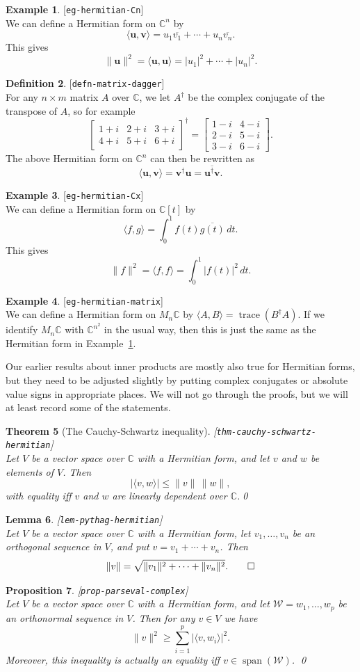 \documentclass{amsart}
\newcommand{\lbl}[1]{\label{#1}\textup{[\texttt{#1}]}\ \\}
\newcommand{\lbl}{\label}
\newcommand{\C}         {{\mathbb{C}}}
\newcommand{\trc}       {\operatorname{trace}}
\newcommand{\spn}       {\operatorname{span}}
\newcommand{\bsm}       {\left[\begin{smallmatrix}}
\newcommand{\esm}       {\end{smallmatrix}\right]}
\newcommand{\tm}        {\times}
\newcommand{\ip}[1]     {\langle #1\rangle}
\newcommand{\ov}[1]     {\overline{#1}}
\newcommand{\vu}        {\mathbf{u}}
\newcommand{\vv}        {\mathbf{v}}
\newcommand{\CW}        {{\mathcal{W}}}
\renewcommand{\:}       {\colon}
\newtheorem{theorem}{Theorem}[section]
\newtheorem{lemma}[theorem]{Lemma}
\newtheorem{proposition}[theorem]{Proposition}
\theoremstyle{definition}
\newtheorem{definition}[theorem]{Definition}
\newtheorem{example}[theorem]{Example}
\begin{document}
\begin{example}\lbl{eg-hermitian-Cn}
 We can define a Hermitian form on $\C^n$ by 
 \[ \ip{\vu,\vv} = u_1\ov{v_1} + \dotsb + u_n\ov{v_n}. \]
 This gives 
 \[ \|\vu\|^2 = \ip{\vu,\vu} = |u_1|^2 + \dotsb + |u_n|^2. \]
\end{example}
\begin{definition}\lbl{defn-matrix-dagger}
 For any $n\tm m$ matrix $A$ over $\C$, we let $A^\dag$ be
 the complex conjugate of the transpose of $A$, so for
 example 
 \[ \bsm 1+i & 2+i & 3+i \\ 4+i & 5+i & 6+i \esm^\dag =
    \bsm 1-i & 4-i \\ 2-i & 5-i \\ 3-i & 6-i \esm.
 \]
 The above Hermitian form on $\C^n$ can then be rewritten as 
 \[ \ip{\vu,\vv} = \vv^\dag\vu = \ov{\vu^\dag\vv}. \]
\end{definition}
\begin{example}\lbl{eg-hermitian-Cx}
 We can define a Hermitian form on $\C[t]$ by 
 \[ \ip{f,g} = \int_0^1 f(t)\ov{g(t)}\, dt. \]
 This gives
 \[ \|f\|^2 = \ip{f,f} = \int_0^1 |f(t)|^2\,dt. \]
\end{example}
\begin{example}\lbl{eg-hermitian-matrix}
 We can define a Hermitian form on $M_n\C$ by
 $\ip{A,B}=\trc(B^\dag A)$.  If we identify $M_n\C$ with
 $\C^{n^2}$ in the usual way, then this is just the same as
 the Hermitian form in Example~\ref{eg-hermitian-Cn}.
\end{example}

Our earlier results about inner products are mostly also
true for Hermitian forms, but they need to be adjusted
slightly by putting complex conjugates or absolute value
signs in appropriate places.  We will not go through the
proofs, but we will at least record some of the statements.
\begin{theorem}[The Cauchy-Schwartz inequality]
\lbl{thm-cauchy-schwartz-hermitian}
 Let $V$ be a vector space over $\C$ with a Hermitian form,
 and let $v$ and $w$ be elements of $V$.  Then
 \[ |\ip{v,w}| \leq \|v\|\,\|w\|, \]
 with equality iff $v$ and $w$ are linearly dependent over
 $\C$.\qed 
\end{theorem}
\begin{lemma}\lbl{lem-pythag-hermitian}
 Let $V$ be a vector space over $\C$ with a Hermitian form,
 let $v_1,\dotsc,v_n$ be an orthogonal sequence in $V$, and
 put $v=v_1+\dotsb+v_n$.  Then 
 \[ \|v\| = \sqrt{\|v_1\|^2 + \dotsb + \|v_n\|^2}. \qed
 \]
\end{lemma}
\begin{proposition}\lbl{prop-parseval-complex}
 Let $V$ be a vector space over $\C$ with a Hermitian form,
 and let $\CW=w_1,\dotsc,w_p$ be an orthonormal sequence in
 $V$.  Then for any $v\in V$ we have
 \[ \|v\|^2 \geq \sum_{i=1}^p |\ip{v,w_i}|^2. \]
 Moreover, this inequality is actually an equality iff
 $v\in\spn(\CW)$. \qed
\end{proposition}
\end{document}
